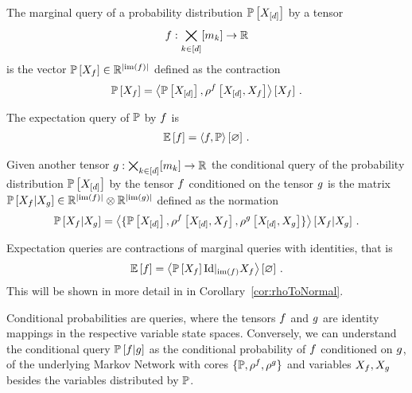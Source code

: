 \begin{definition}\label{def:queries}
	The marginal query of a probability distribution $\mathbb{P}\left[X_{[d]}\right]$ by a tensor 
		\[ f : \bigtimes_{k\in[d]}[m_{k}] \rightarrow \mathbb{R} \]
	is the vector $\mathbb{P}\left[X_{f}\right] \in \mathbb{R}^{\left|\mathrm{im}\left(f\right)\right|}$ defined as the contraction
	\begin{align*}
		\mathbb{P}\left[X_{f}\right] = \left\langle \mathbb{P}\left[X_{[d]}\right],\rho^{f}\left[X_{[d]},X_{f}\right]\right\rangle \left[ X_{f} \right] \, . 
	\end{align*}
	
	The expectation query of $\mathbb{P}$ by $f$ is 
	\begin{align*}
		\mathbb{E}\left[f\right] = \left\langle f, \mathbb{P}\right\rangle \left[ \varnothing \right] \, . 
	\end{align*}
	
	Given another tensor $g: \bigtimes_{k\in[d]}[m_{k}] \rightarrow \mathbb{R} $ the conditional query of the probability distribution $\mathbb{P}\left[X_{[d]}\right]$ by the tensor $f$ conditioned on the tensor $g$ is the matrix $\mathbb{P}\left[X_{f}|X_{g}\right]\in\mathbb{R}^{\left|\mathrm{im}\left(f\right)\right|}\otimes \mathbb{R}^{\left|\mathrm{im}\left(g\right)\right|}$ defined as the normation
	\begin{align*}
		\mathbb{P}\left[X_{f}|X_{g}\right] 
		= \left\langle \{
		\mathbb{P}\left[X_{[d]}\right],\rho^{f}\left[X_{[d]},X_{f}\right],\rho^{g}\left[X_{[d]},X_{g}\right]
		\}\right\rangle \left[ 
		X_{f} | X_{g}
		 \right] \, . 
	\end{align*}
\end{definition}

Expectation queries are contractions of marginal queries with identities, that is
	\[ \mathbb{E}\left[f\right] = \left\langle \mathbb{P}\left[X_{f}\right] {\mathrm{Id}}|_{\mathrm{im}\left(f\right)}{X_{f}} \right\rangle \left[ \varnothing \right] \, . \]
This will be shown in more detail in  in Corollary~\ref{cor:rhoToNormal}.

Conditional probabilities are queries, where the tensors $f$ and $g$ are identity mappings in the respective variable state spaces.
Conversely, we can understand the conditional query $\mathbb{P}\left[f|g\right]$ as the conditional probability of $f$ conditioned on $g$, of the underlying Markov Network with cores $\{\mathbb{P}, \rho^{f}, \rho^{g} \}$ and variables $X_{f},X_{g}$ besides the variables distributed by $\mathbb{P}$.

